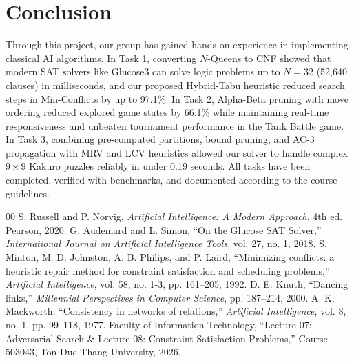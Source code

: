 \documentclass[conference]{IEEEtran}
\begin{document}
\section{Conclusion}
Through this project, our group has gained hands-on experience in implementing classical AI algorithms. In Task 1, converting $N$-Queens to CNF showed that modern SAT solvers like Glucose3 can solve logic problems up to $N=32$ (52,640 clauses) in milliseconds, and our proposed Hybrid-Tabu heuristic reduced search steps in Min-Conflicts by up to 97.1\%. In Task 2, Alpha-Beta pruning with move ordering reduced explored game states by 66.1\% while maintaining real-time responsiveness and unbeaten tournament performance in the Tank Battle game. In Task 3, combining pre-computed partitions, bound pruning, and AC-3 propagation with MRV and LCV heuristics allowed our solver to handle complex $9 \times 9$ Kakuro puzzles reliably in under 0.19 seconds. All tasks have been completed, verified with benchmarks, and documented according to the course guidelines.

\begin{thebibliography}{00}
 S. Russell and P. Norvig, \textit{Artificial Intelligence: A Modern Approach}, 4th ed. Pearson, 2020.
 G. Audemard and L. Simon, ``On the Glucose SAT Solver,'' \textit{International Journal on Artificial Intelligence Tools}, vol. 27, no. 1, 2018.
 S. Minton, M. D. Johnston, A. B. Philips, and P. Laird, ``Minimizing conflicts: a heuristic repair method for constraint satisfaction and scheduling problems,'' \textit{Artificial Intelligence}, vol. 58, no. 1-3, pp. 161--205, 1992.
 D. E. Knuth, ``Dancing links,'' \textit{Millennial Perspectives in Computer Science}, pp. 187--214, 2000.
 A. K. Mackworth, ``Consistency in networks of relations,'' \textit{Artificial Intelligence}, vol. 8, no. 1, pp. 99--118, 1977.
 Faculty of Information Technology, ``Lecture 07: Adversarial Search \& Lecture 08: Constraint Satisfaction Problems,'' Course 503043, Ton Duc Thang University, 2026.
\end{thebibliography}
\end{document}
